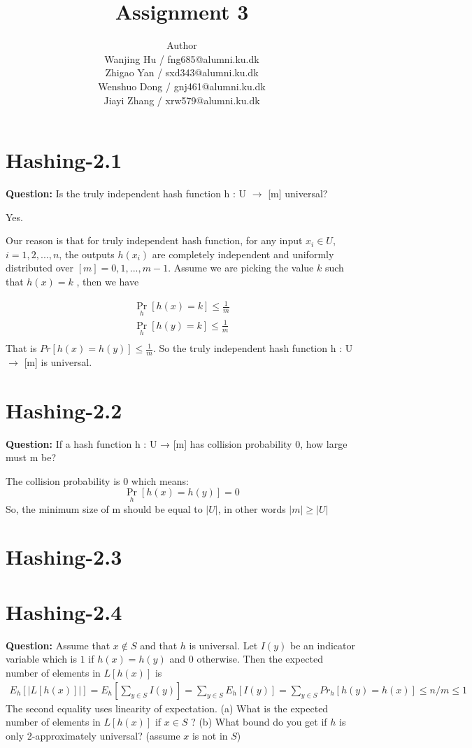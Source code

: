 \documentclass[12pt]{article}
\title{Assignment 3}
\author{Author \\
  Wanjing Hu / fng685@alumni.ku.dk  \\
  Zhigao Yan / sxd343@alumni.ku.dk  \\
  Wenshuo Dong / gnj461@alumni.ku.dk  \\
  Jiayi Zhang / xrw579@alumni.ku.dk \\
}
\begin{document}
\maketitle

\section{Hashing-2.1}
\textbf{Question: } Is the truly independent hash function h : U $\rightarrow$ [m] universal?

Yes. 

Our reason is that for truly independent hash function, for any input $x_i \in U$, $i = 1,2,...,n$, the outputs $h(x_i)$ are completely independent and uniformly distributed over $[m]={0,1,...,m-1}$. Assume we are picking the value $k$ such that $h(x)=k$ , then we have

\begin{equation}
\begin{aligned}
\mathop{Pr} \limits_{h} [h(x)=k] \leq \frac{1}{m}\\
\mathop{Pr} \limits_{h} [h(y)=k] \leq \frac{1}{m}\\
\end{aligned}
\end{equation}
That is $Pr[h(x)=h(y)] \leq \frac{1}{m}$. So the truly independent hash function h : U $\rightarrow$ [m] is universal.

\section{Hashing-2.2}
\textbf{Question:} If a hash function h : U → [m] has collision probability 0, how large must m be?

The collision probability is 0 which means:
\[\mathop{Pr} \limits_{h}[h(x)=h(y)] =0\]
So, the minimum size of m should be equal to \(|U|\), in other words \(|m|\geq|U|\)

\section{Hashing-2.3}

\section{Hashing-2.4}
\textbf{Question:} 
Assume that $x \notin S$ and that $h$ is universal. Let $I(y)$ be an indicator variable which is $1$ if $h(x) = h(y)$ and $0$ otherwise. Then the expected number of elements in $L[h(x)]$ is
\begin{align}
    E_h[|L[h(x)]|] = E_h [\sum_{y\in S} I(y)]  = \sum_{y \in S} E_h[I(y)] = \sum_{y \in S} Pr_h[h(y) = h(x)] \leq n/m \leq 1
\end{align}
 The second equality uses linearity of expectation.
(a) What is the expected number of elements in $L[h(x)]$ if $x \in S$ ?
(b) What bound do you get if $h$ is only 2-approximately universal? (assume $x$ is not in $S$)
\end{document}
